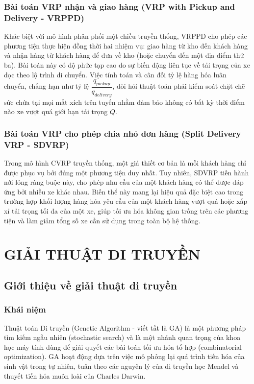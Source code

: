 \documentclass[12pt,a4paper]{article}
\numberwithin{figure}{subsection}
\begin{document}
\subsubsection{Bài toán VRP nhận và giao hàng (VRP with Pickup and Delivery - VRPPD)}Khác biệt với mô hình phân phối một chiều truyền thống, VRPPD cho phép các phương tiện thực hiện đồng thời hai nhiệm vụ: giao hàng từ kho đến khách hàng và nhận hàng từ khách hàng để đưa về kho (hoặc chuyển đến một địa điểm thứ ba). Bài toán này có độ phức tạp cao do sự biến động liên tục về tải trọng của xe dọc theo lộ trình di chuyển. Việc tính toán và cân đối tỷ lệ hàng hóa luân chuyển, chẳng hạn như tỷ lệ $\dfrac{q_{pickup}}{q_{delivery}}$, đòi hỏi thuật toán phải kiểm soát chặt chẽ sức chứa tại mọi mắt xích trên tuyến nhằm đảm bảo không có bất kỳ thời điểm nào xe vượt quá giới hạn tải trọng $Q$.

\subsubsection{Bài toán VRP cho phép chia nhỏ đơn hàng (Split Delivery VRP - SDVRP)}Trong mô hình CVRP truyền thống, một giả thiết cơ bản là mỗi khách hàng chỉ được phục vụ bởi đúng một phương tiện duy nhất. Tuy nhiên, SDVRP tiến hành nới lỏng ràng buộc này, cho phép nhu cầu của một khách hàng có thể được đáp ứng bởi nhiều xe khác nhau. Biến thể này mang lại hiệu quả đặc biệt cao trong trường hợp khối lượng hàng hóa yêu cầu của một khách hàng vượt quá hoặc xấp xỉ tải trọng tối đa của một xe, giúp tối ưu hóa không gian trống trên các phương tiện và làm giảm tổng số xe cần sử dụng trong toàn bộ hệ thống.

\section{GIẢI THUẬT DI TRUYỀN}
\subsection{Giới thiệu về giải thuật di truyền}
\subsubsection{Khái niệm}

Thuật toán Di truyền (Genetic Algorithm - viết tắt là GA) là một phương pháp tìm kiếm ngẫu nhiên (stochastic search) và là một nhánh quan trọng của khoa học máy tính dùng để giải quyết các bài toán tối ưu hóa tổ hợp (combinatorial optimization). GA hoạt động dựa trên việc mô phỏng lại quá trình tiến hóa của sinh vật trong tự nhiên, tuân theo các nguyên lý của di truyền học Mendel và thuyết tiến hóa muôn loài của Charles Darwin.
\end{document}
